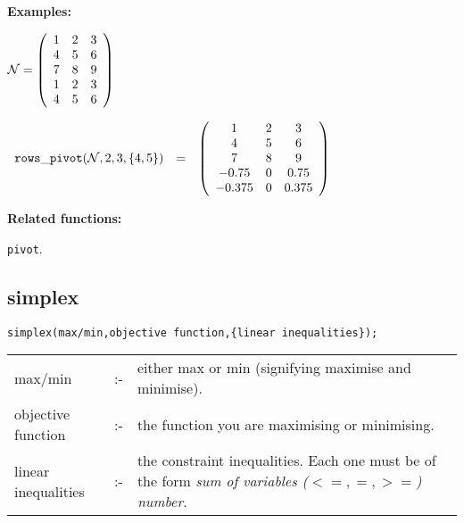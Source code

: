 {\bf Examples:}

\begin{flushleft}
\hspace*{0.175in}
\begin{math}
{\cal N} = \left( \begin{array}{ccc} 1 & 2 & 3 \\ 4 & 5 & 6 \\ 7 & 8 &
9 \\1 & 2 & 3 \\ 4 & 5 & 6
\end{array} \right)
\end{math}
\end{flushleft}

\begin{flushleft}
\hspace*{0.1in}
\begin{math}
\begin{array}{ccc}
{\tt rows\_pivot}({\cal N},2,3,\{4,5\}) & = & \left( \begin{array}
{c c c}1 & 2 & 3 \\ 4 & 5 & 6 \\ 7 & 8 & 9 \\ -0.75 & 0 & 0.75 \\
-0.375 & 0 & 0.375
 \end{array} \right)
\end{array}
\end{math}
\end{flushleft}

{\bf Related functions:}

\hspace*{0.175in} {\tt pivot}.


\subsection{simplex}


\hspace*{0.175in} {\tt simplex(max/min,objective function,\{linear
inequalities\});}

\hspace*{0.1in}
\begin{tabular}{l l l}
max/min             & :- & \parbox[t]{.63\linewidth}{either max or min
                           (signifying maximise and minimise).} \\
objective function  & :- & the function you are maximising or
                           minimising. \\
linear inequalities & :- & \parbox[t]{.63\linewidth}{the constraint
                           inequalities. Each one must be of the form
                           {\it sum of variables ($<=,=,>=$) number}.}
\end{tabular}


